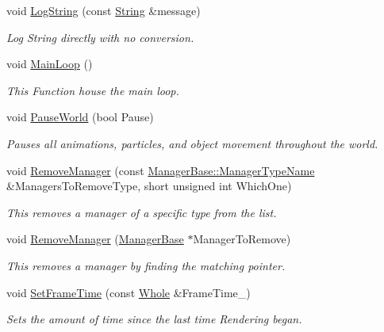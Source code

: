 \begin{DoxyCompactItemize}
void \hyperlink{classMezzanine_1_1World_a326001a06856d359fa7164db25d7c68c}{LogString} (const \hyperlink{namespaceMezzanine_acf9fcc130e6ebf08e3d8491aebcf1c86}{String} \&message)
\begin{DoxyCompactList}\small\item\em Log String directly with no conversion. \item\end{DoxyCompactList}\item 
void \hyperlink{classMezzanine_1_1World_a7c19ed5889b3de00a6f475b5922f9545}{MainLoop} ()
\begin{DoxyCompactList}\small\item\em This Function house the main loop. \item\end{DoxyCompactList}\item 
void \hyperlink{classMezzanine_1_1World_a4fa4ecf5f6dff624f0db8163d81affc6}{PauseWorld} (bool Pause)
\begin{DoxyCompactList}\small\item\em Pauses all animations, particles, and object movement throughout the world. \item\end{DoxyCompactList}\item 
void \hyperlink{classMezzanine_1_1World_a64ac8469729593975fc5551f75a60283}{RemoveManager} (const \hyperlink{classMezzanine_1_1ManagerBase_a08cecf5169cad3e82be81a3a159b0b6e}{ManagerBase::ManagerTypeName} \&ManagersToRemoveType, short unsigned int WhichOne)
\begin{DoxyCompactList}\small\item\em This removes a manager of a specific type from the list. \item\end{DoxyCompactList}\item 
void \hyperlink{classMezzanine_1_1World_a01fadbd8c39094bac02d855da8d4a30f}{RemoveManager} (\hyperlink{classMezzanine_1_1ManagerBase}{ManagerBase} $\ast$ManagerToRemove)
\begin{DoxyCompactList}\small\item\em This removes a manager by finding the matching pointer. \item\end{DoxyCompactList}\item 
void \hyperlink{classMezzanine_1_1World_a6c00a6eda421a1d6969621bf366524f3}{SetFrameTime} (const \hyperlink{namespaceMezzanine_adcbb6ce6d1eb4379d109e51171e2e493}{Whole} \&FrameTime\_\-)
\begin{DoxyCompactList}\small\item\em Sets the amount of time since the last time Rendering began. \item\end{DoxyCompactList}\item 

\end{DoxyCompactItemize}
